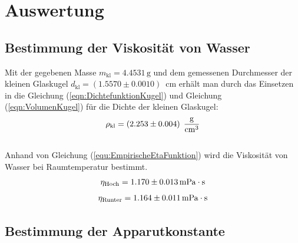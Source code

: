 

\section{Auswertung}
\label{sec:Auswertung}

\subsection{Bestimmung der Viskosität von Wasser}
\label{sec:}
Mit der gegebenen Masse $m_{\text{kl}} = 4.4531\,\unit{\gram}$  und dem gemessenen Durchmesser 
der kleinen Glaskugel $d_{\text{kl}}= \left(1.5570 \pm 0.0010\right)\,$ \unit{\centi \meter} erhält man durch
das Einsetzen in die Gleichung (\ref{eqn:DichtefunktionKugel}) und Gleichung (\ref{eqn:VolumenKugel}) für 
die Dichte der kleinen Glaskugel:
$$\rho_{\text{kl}} = \left(2.253 \pm 0.004\right)\;\unit[per-mode=fraction]{\gram\per\cubic\centi\meter}$$\\
Anhand von Gleichung (\ref{equ:EmpirischeEtaFunktion}) wird die Viskosität von Wasser bei Raumtemperatur bestimmt. 
$$\eta_{\text{Hoch}} = 1.170\pm0.013 \, \unit[inter-unit-product=\cdot]{\milli\pascal\second}$$
$$\eta_{\text{Runter}} = 1.164\pm0.011  \, \unit[inter-unit-product=\cdot]{\milli\pascal\second}$$
\subsection{Bestimmung der Apparutkonstante}
\label{sec:}


